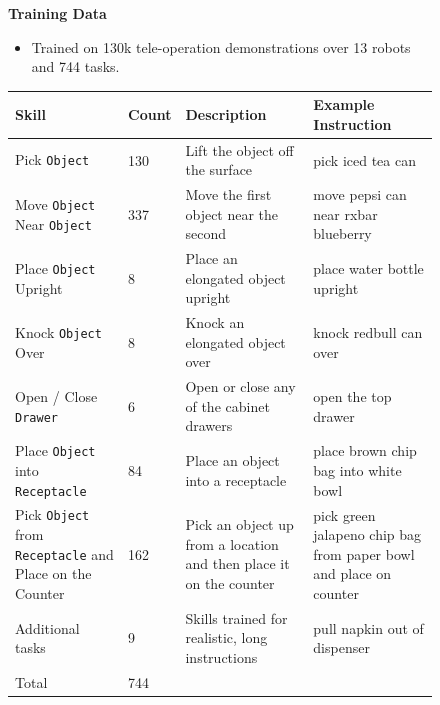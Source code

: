 \documentclass{article} %
\begin{document}
\begin{figure}
\begin{framed}
\textbf{Training Data}
\begin{itemize}[topsep=2pt,itemsep=-0.5ex,partopsep=1ex,parsep=1ex]
    \item Trained on 130k tele-operation demonstrations over 13 robots and 744 tasks. 
\end{itemize}

\begin{minipage}{0.31\textwidth}

\begin{center}
\setlength\tabcolsep{2.0pt}
\scriptsize
\begin{tabular}{p{3.5cm} p{0.75cm} p{4.5cm} p{4cm}}
\toprule
Skill & Count & Description & Example Instruction\\
\midrule

Pick \texttt{Object} & 130 & Lift the object off the surface & pick iced tea can \\

Move \texttt{Object} Near \texttt{Object} & 337 & Move the first object near the second & move pepsi can near rxbar blueberry\\

Place \texttt{Object} Upright & 8 & Place an elongated object upright & place water bottle upright\\

Knock \texttt{Object} Over & 8 & Knock an elongated object over & knock redbull can over\\

Open / Close \texttt{Drawer} & 6 & Open or close any of the cabinet drawers & open the top drawer \\


Place \texttt{Object} into \texttt{Receptacle} & 84 & Place an object into a receptacle & place brown chip bag into white bowl\\


Pick \texttt{Object} from \texttt{Receptacle} and Place on the Counter & 162 & Pick an object up from a location and then place it on the counter  & pick green jalapeno chip bag from paper bowl and place on counter \\
\midrule
Additional tasks & 9 & Skills trained for realistic, long instructions & pull napkin out of dispenser \\






\midrule
Total & 744 \\
\bottomrule
\end{tabular}
\end{center}
\end{minipage}
\vspace{.5em}



\end{framed}
\end{figure}
\end{document}
